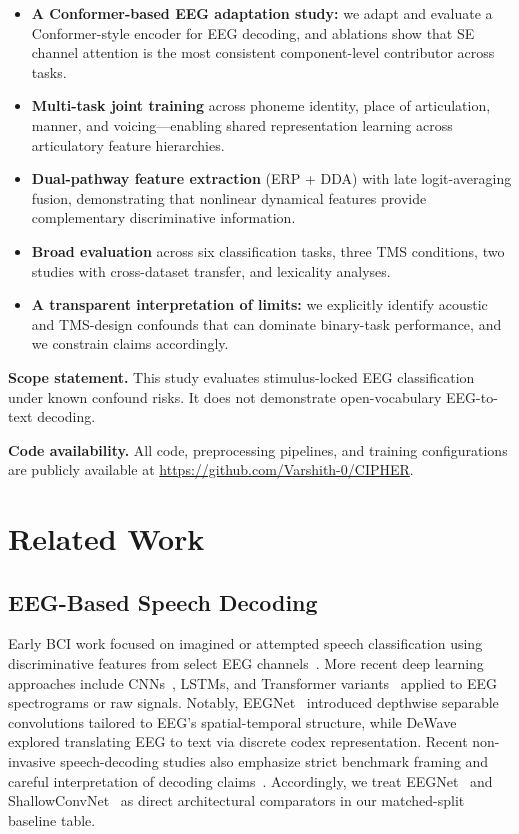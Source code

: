 \documentclass[11pt,a4paper]{article}
\begin{document}
\begin{itemize}
  \item \textbf{A Conformer-based EEG adaptation study:} we adapt and evaluate
    a Conformer-style encoder for EEG decoding, and ablations show that SE
    channel attention is the most consistent component-level contributor across
    tasks.
  \item \textbf{Multi-task joint training} across phoneme identity, place of
    articulation, manner, and voicing---enabling shared representation learning
    across articulatory feature hierarchies.
  \item \textbf{Dual-pathway feature extraction} (ERP + DDA) with late
    logit-averaging fusion, demonstrating that nonlinear dynamical features
    provide complementary discriminative information.
  \item \textbf{Broad evaluation} across six classification tasks, three TMS
    conditions, two studies with cross-dataset transfer, and lexicality
    analyses.
  \item \textbf{A transparent interpretation of limits:} we explicitly identify
    acoustic and TMS-design confounds that can dominate binary-task performance,
    and we constrain claims accordingly.
\end{itemize}

\textbf{Scope statement.} This study evaluates stimulus-locked EEG
classification under known confound risks. It does not demonstrate
open-vocabulary EEG-to-text decoding.

\textbf{Code availability.} All code, preprocessing pipelines, and
training configurations are publicly available at
\url{https://github.com/Varshith-0/CIPHER}.

\section{Related Work}

\subsection{EEG-Based Speech Decoding}

Early BCI work focused on imagined or attempted speech classification using
discriminative features from select EEG channels~\cite{herff2016}. More recent
deep learning approaches include CNNs~\cite{schirrmeister2017}, LSTMs, and
Transformer variants~\cite{song2023} applied to EEG spectrograms or raw
signals. Notably, EEGNet~\cite{lawhern2018} introduced depthwise separable
convolutions tailored to EEG's spatial-temporal structure, while
DeWave~\cite{duan2023} explored translating EEG to text via discrete codex
representation. Recent non-invasive speech-decoding studies also emphasize
strict benchmark framing and careful interpretation of decoding
claims~\cite{defossez2023}. Accordingly, we treat EEGNet~\cite{lawhern2018}
and ShallowConvNet~\cite{schirrmeister2017} as direct architectural comparators
in our matched-split baseline table.
\end{document}
